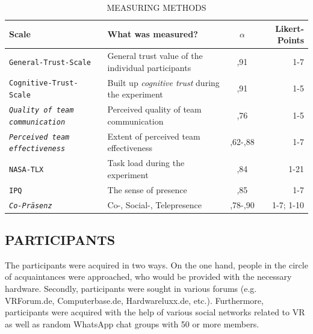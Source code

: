 \documentclass[sigchi]{acmart}
\begin{document}
\begin{table}
  \caption{MEASURING METHODS}
  \label{tab:commands}
  \begin{tabular}{llcr}
    \toprule
    Scale & What was measured? & $\alpha$ & Likert-Points \\
    \midrule
    \texttt{General-Trust-Scale \citep{couch1996assessment}} & General trust value of the individual participants & ,91 & 1-7 \\
    
    \texttt{Cognitive-Trust-Scale  \citep[S. 37]{mcallister1995affect}} &Built up \textit{cognitive trust} during the experiment & ,91 & 1-5\\
    
     \texttt{\textit{Quality of team communication} \citep[S. 1049]{gonzalez2014climate}} & Perceived quality of team communication & ,76 & 1-5 \\
     
      \texttt{\textit{Perceived team effectiveness}\citep[S. 469]{gibson2003team}} & Extent of perceived team effectiveness & ,62-,88 & 1-7\\
          
       \texttt{NASA-TLX\citep{NASATLX}} & Task load during the experiment & ,84 &1-21  \\
       
       \texttt{IPQ \citep{IPQ}} & The sense of presence & ,85 & 1-7 \\
       
        \texttt{\textit{Co-Präsenz} \citep[S. 487]{nowak2003effect}} &  Co-, Social-, Telepresence & ,78-,90 & 1-7; 1-10 \\
    \bottomrule
  \end{tabular}
\end{table}

\subsection{PARTICIPANTS}

The participants were acquired in two ways. On the one hand, people in the circle of acquaintances were approached, who would be provided with the necessary hardware. Secondly, participants were sought in various forums (e.g. VRForum.de, Computerbase.de, Hardwareluxx.de, etc.). Furthermore, participants were acquired with the help of various social networks related to VR as well as random WhatsApp chat groups with 50 or more members.
\end{document}
